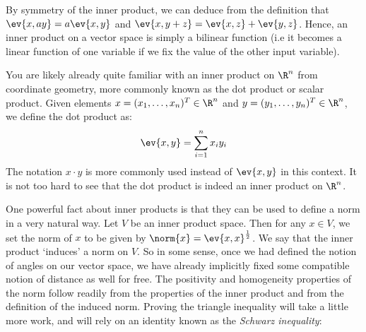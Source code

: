 By symmetry of the inner product, we can deduce from the definition that \( \ev{x,ay}=a\ev{x,y} \) and \( \ev{x,y+z}=\ev{x,z}+\ev{y,z} \). Hence, an inner product on a vector space is simply a bilinear function (i.e it becomes a linear function of one variable if we fix the value of the other input variable).

\vspace{3mm}

You are likely already quite familiar with an inner product on \( \R^n \) from coordinate geometry, more commonly known as the dot product or scalar product. Given elements \( x=(x_1,\dots,x_n)^T\in\R^n \) and \( y=(y_1,\dots,y_n)^T\in\R^n \), we define the dot product as:
\[ \ev{x,y}=\sum_{i=1}^nx_iy_i \]
The notation \( x\cdot y \) is more commonly used instead of \( \ev{x,y} \) in this context. It is not too hard to see that the dot product is indeed an inner product on \( \R^n \).

\vspace{3mm}

One powerful fact about inner products is that they can be used to define a norm in a very natural way. Let \( V \) be an inner product space. Then for any \( x\in V \), we set the norm of \( x \) to be given by \( \norm{x}=\ev{x,x}^{\frac{1}{2}} \). We say that the inner product `induces' a norm on \( V \). So in some sense, once we had defined the notion of angles on our vector space, we have already implicitly fixed some compatible notion of distance as well for free. The positivity and homogeneity properties of the norm follow readily from the properties of the inner product and from the definition of the induced norm. Proving the triangle inequality will take a little more work, and will rely on an identity known as the \emph{Schwarz inequality}:

